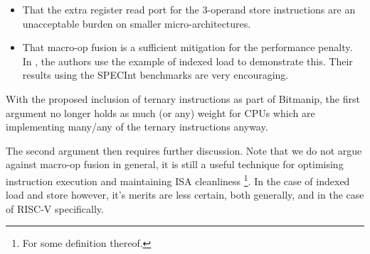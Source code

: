 \begin{itemize}
\item That the extra register read port for the 3-operand store instructions
    are an unacceptable burden on smaller micro-architectures.
\item That macro-op fusion is a sufficient mitigation for the performance
    penalty.
    In \cite[Sections V, VI]{CDPA:16}, the authors use the example of
    indexed load to demonstrate this.
    Their results using the SPECInt benchmarks are very encouraging.
\end{itemize}

With the proposed inclusion of ternary instructions as part of Bitmanip, the
first argument no longer holds as much (or any) weight for CPUs which are
implementing many/any of the ternary instructions anyway.

The second argument then requires further discussion.
Note that we do not argue against macro-op fusion in general, it
is still a useful technique for optimising instruction execution
and maintaining ISA cleanliness \footnote{For some definition thereof.}.
In the case of indexed load and store however, it's merits are
less certain, both generally, and in the case of RISC-V specifically.

